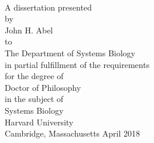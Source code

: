 \thispagestyle{empty}
\begin{center}

  \vfil
  {\large\thetitle}\\
  \vfil
  A dissertation presented\\
  by\\
  John H. Abel\\
  to\\
  The Department of Systems Biology\\
  \vfil
  in partial fulfillment of the requirements\\
  for the degree of\\
  Doctor of Philosophy\\
  in the subject of\\
  Systems Biology\\
  \vfil
  Harvard University\\
  Cambridge, Massachusetts
  \vfil
  April 2018
\end{center}
